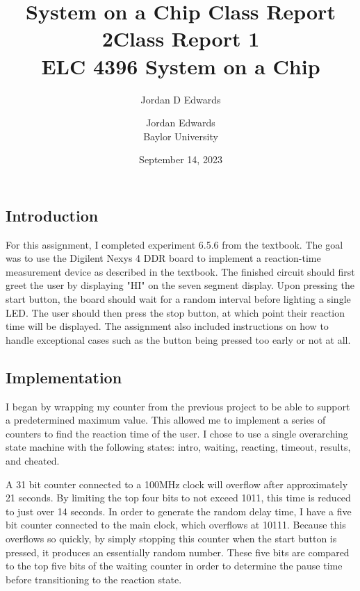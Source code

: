 \documentclass{article}
\title{System on a Chip Class Report 2}
\author{Jordan D Edwards}
\begin{document}
	
	\title{Class Report 1
		\\ \large{ELC 4396 System on a Chip}  }
	
	\author{Jordan Edwards \\ Baylor University} %
	\date{September 14, 2023}
	\maketitle
	
	\subsection*{Introduction}
	For this assignment, I completed experiment 6.5.6 from the textbook. The goal was to use the Digilent Nexys 4 DDR board to implement a reaction-time measurement device as described in the textbook. The finished circuit should first greet the user by displaying "HI" on the seven segment display. Upon pressing the start button, the board should wait for a random interval before lighting a single LED. The user should then press the stop button, at which point their reaction time will be displayed. The assignment also included instructions on how to handle exceptional cases such as the button being pressed too early or not at all.
	
	
	\subsection*{Implementation}
	I began by wrapping my counter from the previous project to be able to support a predetermined maximum value. This allowed me to implement a series of counters to find the reaction time of the user. I chose to use a single overarching state machine with the following states: intro, waiting, reacting, timeout, results, and cheated.
	
	A 31 bit counter connected to a 100MHz clock will overflow after approximately 21 seconds. By limiting the top four bits to not exceed 1011, this time is reduced to just over 14 seconds. In order to generate the random delay time, I have a five bit counter connected to the main clock, which overflows at 10111. Because this overflows so quickly, by simply stopping this counter when the start button is pressed, it produces an essentially random number. These five bits are compared to the top five bits of the waiting counter in order to determine the pause time before transitioning to the reaction state.
	
\end{document}
